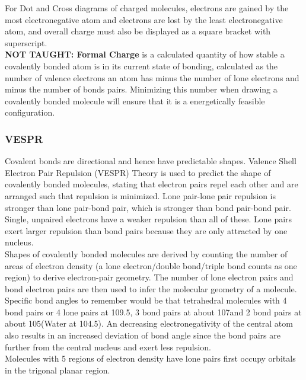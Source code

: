 \documentclass[../main]{subfiles}
\begin{document}
	For Dot and Cross diagrams of charged molecules, electrons are gained by the most electronegative atom and electrons are lost by the least electronegative atom, and overall charge must also be displayed as a square bracket with superscript. \\

	\textbf{NOT TAUGHT: Formal Charge} is a calculated quantity of how stable a covalently bonded atom is in its current state of bonding, calculated as the number of valence electrons an atom has minus the number of lone electrons and minus the number of bonds pairs. Minimizing this number when drawing a covalently bonded molecule will ensure that it is a energetically feasible configuration.

	\subsubsection{VESPR}

	Covalent bonds are directional and hence have predictable shapes. Valence Shell Electron Pair Repulsion (VESPR) Theory is used to predict the shape of covalently bonded molecules, stating that electron pairs repel each other and are arranged such that repulsion is minimized. Lone pair-lone pair repulsion is stronger than lone pair-bond pair, which is stronger than bond pair-bond pair. Single, unpaired electrons have a weaker repulsion than all of these. Lone pairs exert larger repulsion than bond pairs because they are only attracted by one nucleus. \\

	Shapes of covalently bonded molecules are derived by counting the number of areas of electron density (a lone electron/double bond/triple bond counts as one region) to derive electron-pair geometry. The number of lone electron pairs and bond electron pairs are then used to infer the molecular geometry of a molecule. \\

	Specific bond angles to remember would be that tetrahedral molecules with 4 bond pairs or 4 lone pairs at 109.5\degree, 3 bond pairs at about 107\degree and 2 bond pairs at about 105\degree (Water at 104.5\degree). An decreasing electronegativity of the central atom also results in an increased deviation of bond angle since the bond pairs are further from the central nucleus and exert less repulsion. \\

	Molecules with 5 regions of electron density have lone pairs first occupy orbitals in the trigonal planar region. \\
\end{document}
